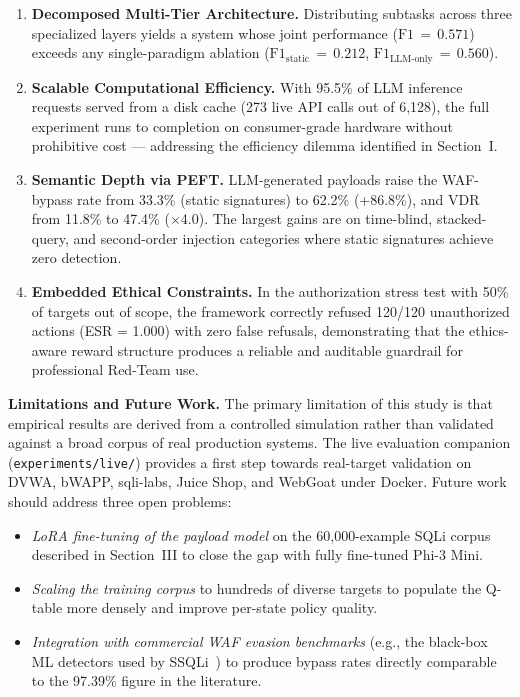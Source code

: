 \begin{enumerate}
  \item \textbf{Decomposed Multi-Tier Architecture.} Distributing subtasks
        across three specialized layers yields a system whose joint performance
        ($\text{F1}\,{=}\,0.571$) exceeds any single-paradigm ablation
        ($\text{F1}_{\text{static}}\,{=}\,0.212$, $\text{F1}_{\text{LLM-only}}\,{=}\,0.560$).

  \item \textbf{Scalable Computational Efficiency.} With 95.5\% of LLM
        inference requests served from a disk cache (273 live API calls out of
        6{,}128), the full experiment runs to completion on consumer-grade hardware
        without prohibitive cost — addressing the efficiency dilemma identified in
        Section~I.

  \item \textbf{Semantic Depth via PEFT.} LLM-generated payloads raise the
        WAF-bypass rate from 33.3\% (static signatures) to 62.2\% (+86.8\%), and
        VDR from 11.8\% to 47.4\% ($\times$4.0). The largest gains are on
        time-blind, stacked-query, and second-order injection categories where
        static signatures achieve zero detection.

  \item \textbf{Embedded Ethical Constraints.} In the authorization stress
        test with 50\% of targets out of scope, the framework correctly refused
        120/120 unauthorized actions (ESR = 1.000) with zero false refusals,
        demonstrating that the ethics-aware reward structure produces a reliable
        and auditable guardrail for professional Red-Team use.
\end{enumerate}

\noindent\textbf{Limitations and Future Work.}
The primary limitation of this study is that empirical results are derived from
a controlled simulation rather than validated against a broad corpus of real
production systems. The live evaluation companion (\texttt{experiments/live/})
provides a first step towards real-target validation on DVWA, bWAPP, sqli-labs,
Juice Shop, and WebGoat under Docker. Future work should address three open
problems:

\begin{itemize}
  \item \emph{LoRA fine-tuning of the payload model} on the 60{,}000-example
        SQLi corpus described in Section~III to close the gap with fully
        fine-tuned Phi-3 Mini.
  \item \emph{Scaling the training corpus} to hundreds of diverse targets to
        populate the Q-table more densely and improve per-state policy quality.
  \item \emph{Integration with commercial WAF evasion benchmarks} (e.g., the
        black-box ML detectors used by SSQLi~\cite{guan2023ssqli}) to produce
        bypass rates directly comparable to the 97.39\% figure in the literature.
\end{itemize}

